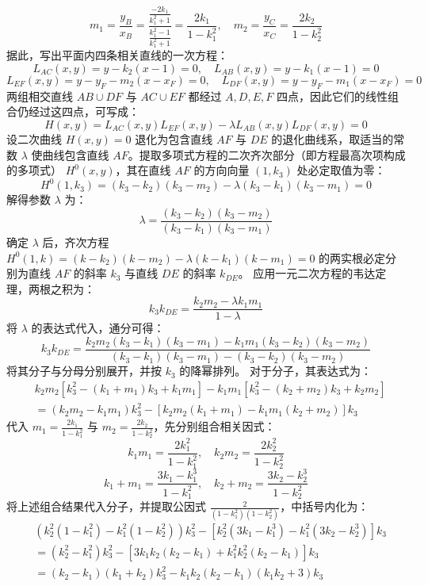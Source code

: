 \begin{solution}
\[ m_1 = \frac{y_B}{x_B} = \frac{\frac{-2k_1}{k_1^2+1}}{\frac{k_1^2-1}{k_1^2+1}} = \frac{2k_1}{1-k_1^2}, \quad m_2 = \frac{y_C}{x_C} = \frac{2k_2}{1-k_2^2} \]
据此，写出平面内四条相关直线的一次方程：
\[ L_{AC}(x,y) = y - k_2(x-1) = 0, \quad L_{AB}(x,y) = y - k_1(x-1) = 0 \]
\[ L_{EF}(x,y) = y - y_F - m_2(x-x_F) = 0, \quad L_{DF}(x,y) = y - y_F - m_1(x-x_F) = 0 \]
两组相交直线 $AB \cup DF$ 与 $AC \cup EF$ 都经过 $A,D,E,F$ 四点，因此它们的线性组合仍经过这四点，可写成：
\[ H(x,y) = L_{AC}(x,y)L_{EF}(x,y) - \lambda L_{AB}(x,y)L_{DF}(x,y) = 0 \]
设二次曲线 $H(x,y)=0$ 退化为包含直线 $AF$ 与 $DE$ 的退化曲线系，取适当的常数 $\lambda$ 使曲线包含直线 $AF$。提取多项式方程的二次齐次部分（即方程最高次项构成的多项式） $H^0(x,y)$，其在直线 $AF$ 的方向向量 $(1, k_3)$ 处必定取值为零：
\[ H^0(1, k_3) = (k_3 - k_2)(k_3 - m_2) - \lambda (k_3 - k_1)(k_3 - m_1) = 0 \]
解得参数 $\lambda$ 为：
\[ \lambda = \frac{(k_3 - k_2)(k_3 - m_2)}{(k_3 - k_1)(k_3 - m_1)} \]
确定 $\lambda$ 后，齐次方程 $H^0(1, k) = (k - k_2)(k - m_2) - \lambda (k - k_1)(k - m_1) = 0$ 的两实根必定分别为直线 $AF$ 的斜率 $k_3$ 与直线 $DE$ 的斜率 $k_{DE}$。
应用一元二次方程的韦达定理，两根之积为：
\[ k_3 k_{DE} = \frac{k_2 m_2 - \lambda k_1 m_1}{1 - \lambda} \]
将 $\lambda$ 的表达式代入，通分可得：
\[ k_3 k_{DE} = \frac{k_2 m_2 (k_3 - k_1)(k_3 - m_1) - k_1 m_1 (k_3 - k_2)(k_3 - m_2)}{(k_3 - k_1)(k_3 - m_1) - (k_3 - k_2)(k_3 - m_2)} \]
将其分子与分母分别展开，并按 $k_3$ 的降幂排列。
对于分子，其表达式为：
\begin{align*}
& k_2 m_2 \left[ k_3^2 - (k_1 + m_1)k_3 + k_1 m_1 \right] - k_1 m_1 \left[ k_3^2 - (k_2 + m_2)k_3 + k_2 m_2 \right] \\
&= (k_2 m_2 - k_1 m_1) k_3^2 - \left[ k_2 m_2 (k_1 + m_1) - k_1 m_1 (k_2 + m_2) \right] k_3
\end{align*}
代入 $m_1 = \frac{2k_1}{1 - k_1^2}$ 与 $m_2 = \frac{2k_2}{1 - k_2^2}$，先分别组合相关因式：
\[ k_1 m_1 = \frac{2k_1^2}{1 - k_1^2}, \quad k_2 m_2 = \frac{2k_2^2}{1 - k_2^2} \]
\[ k_1 + m_1 = \frac{3k_1 - k_1^3}{1 - k_1^2}, \quad k_2 + m_2 = \frac{3k_2 - k_2^3}{1 - k_2^2} \]
将上述组合结果代入分子，并提取公因式 $\frac{2}{(1 - k_1^2)(1 - k_2^2)}$，中括号内化为：
\begin{align*}
& \left( k_2^2 (1 - k_1^2) - k_1^2 (1 - k_2^2) \right) k_3^2 - \left[ k_2^2 (3k_1 - k_1^3) - k_1^2 (3k_2 - k_2^3) \right] k_3 \\
&= (k_2^2 - k_1^2) k_3^2 - \left[ 3k_1 k_2 (k_2 - k_1) + k_1^2 k_2^2 (k_2 - k_1) \right] k_3 \\
&= (k_2 - k_1)(k_1 + k_2) k_3^2 - k_1 k_2 (k_2 - k_1)(k_1 k_2 + 3) k_3 \\

\end{align*}
\end{solution}
